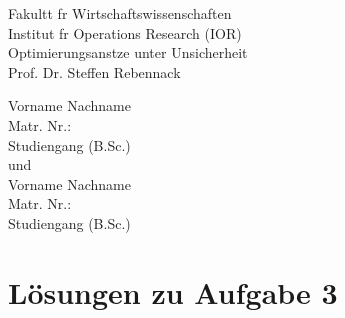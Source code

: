 \documentclass[a4paper,12pt]{article}
\begin{document}
\begin{titlepage}
    \begin{center}
        \vspace*{-80pt}

        \vspace*{40pt}

        Fakultt fr Wirtschaftswissenschaften \\[1ex]
        Institut fr Operations Research (IOR) \\[1ex]
        Optimierungsanstze unter Unsicherheit \\[1ex]
        Prof. Dr. Steffen Rebennack          

        \vspace*{25pt}   

        \vspace*{35pt}

        \fboxsep 40pt
        \fboxrule 6pt

        \vspace*{40pt}

        \normalsize

        Vorname Nachname\\
        Matr. Nr.:\\
        Studiengang (B.Sc.)\\[4ex]

        und \\[4ex]

        Vorname Nachname\\
        Matr. Nr.:\\
        Studiengang (B.Sc.)\\[4ex]
    \end{center}
\end{titlepage}

\newpage

\section*{L\"osungen zu Aufgabe 3}
\end{document}
